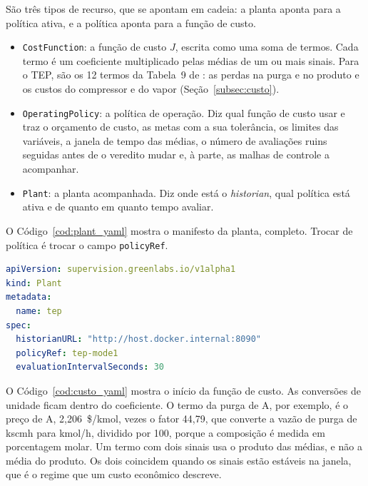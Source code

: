 São três tipos de recurso, que se apontam em cadeia: a planta aponta para a política ativa, e a política aponta para a função de custo.
\begin{itemize}
	\item \texttt{CostFunction}: a função de custo $J$, escrita como uma soma de termos. Cada termo é um coeficiente multiplicado pelas médias de um ou mais sinais. Para o TEP, são os 12 termos da Tabela~9 de : as perdas na purga e no produto e os custos do compressor e do vapor (Seção~\ref{subsec:custo}).
	\item \texttt{OperatingPolicy}: a política de operação. Diz qual função de custo usar e traz o orçamento de custo, as metas com a sua tolerância, os limites das variáveis, a janela de tempo das médias, o número de avaliações ruins seguidas antes de o veredito mudar e, à parte, as malhas de controle a acompanhar.
	\item \texttt{Plant}: a planta acompanhada. Diz onde está o \textit{historian}, qual política está ativa e de quanto em quanto tempo avaliar.
\end{itemize}

O Código~\ref{cod:plant_yaml} mostra o manifesto da planta, completo. Trocar de política é trocar o campo \texttt{policyRef}.

\noindent\begin{minipage}{\linewidth}
\begin{lstlisting}[language=yaml, caption={Manifesto da \texttt{Plant} do TEP}, label={cod:plant_yaml}]
apiVersion: supervision.greenlabs.io/v1alpha1
kind: Plant
metadata:
  name: tep
spec:
  historianURL: "http://host.docker.internal:8090"
  policyRef: tep-mode1
  evaluationIntervalSeconds: 30
\end{lstlisting}
\end{minipage}

O Código~\ref{cod:custo_yaml} mostra o início da função de custo. As conversões de unidade ficam dentro do coeficiente. O termo da purga de A, por exemplo, é o preço de A, 2,206~\$/kmol, vezes o fator 44,79, que converte a vazão de purga de kscmh para kmol/h, dividido por 100, porque a composição é medida em porcentagem molar. Um termo com dois sinais usa o produto das médias, e não a média do produto. Os dois coincidem quando os sinais estão estáveis na janela, que é o regime que um custo econômico descreve.

